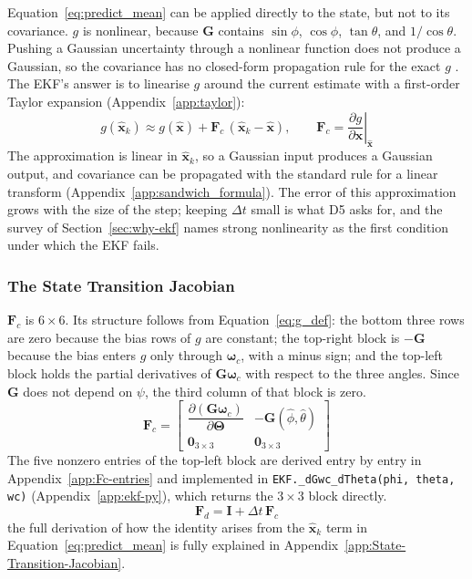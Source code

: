 \documentclass[12pt,a4paper]{article}
\newcommand{\bx}{\bm{x}}
\newcommand{\bF}{\bm{F}}
\newcommand{\bG}{\bm{G}}
\newcommand{\bI}{\bm{I}}
\newcommand{\bomega}{\bm{\omega}}
\newcommand{\bTheta}{\bm{\Theta}}
\begin{document}
{Equation~\eqref{eq:predict_mean} can be applied directly to the
state, but not to its covariance. $g$ is nonlinear, because $\bG$
contains $\sin\phi$, $\cos\phi$, $\tan\theta$, and $1/\cos\theta$.
Pushing a Gaussian uncertainty through a nonlinear function does not
produce a Gaussian, so the covariance has no closed-form
propagation rule for the exact $g$ \citep{grewal2015kalman}. The
EKF's answer is to linearise $g$ around the current estimate with a
first-order Taylor expansion (Appendix~\ref{app:taylor}):
\begin{equation}
  g(\hat{\bx}_k) \approx g(\hat{\bx}) + \bF_c\,(\hat{\bx}_k - \hat{\bx}),
  \qquad
  \bF_c = \left.\frac{\partial g}{\partial \bx}\right|_{\hat{\bx}}
  \label{eq:taylor}
\end{equation}
The approximation is linear in $\hat{\bx}_k$, so a Gaussian input
produces a Gaussian output, and covariance can be propagated with
the standard rule for a linear transform
(Appendix~\ref{app:sandwich_formula}). The error of this
approximation grows with the size of the step; keeping $\Delta t$
small is what D5 asks for, and the survey of
Section~\ref{sec:why-ekf} names strong nonlinearity as the first
condition under which the EKF fails.

\subsubsection{The State Transition Jacobian}

$\bF_c$ is $6\times 6$. Its structure follows from
Equation~\eqref{eq:g_def}: the bottom three rows are zero because
the bias rows of $g$ are constant; the top-right block is $-\bG$
because the bias enters $g$ only through $\bomega_c$, with a minus
sign; and the top-left block holds the partial derivatives of
$\bG\bomega_c$ with respect to the three angles. Since $\bG$ does
not depend on $\psi$, the third column of that block is zero.
\begin{equation}
  \bF_c =
  \begin{bmatrix}
    \dfrac{\partial(\bG\bomega_c)}{\partial\bTheta} & -\bG(\hat{\phi},\hat{\theta}) \\[1em]
    \bm{0}_{3\times 3} & \bm{0}_{3\times 3}
  \end{bmatrix} 
  \label{eq:Fc}
\end{equation}
The five nonzero entries of the top-left block are derived entry by
entry in Appendix~\ref{app:Fc-entries} and implemented in
\texttt{EKF.\_dGwc\_dTheta(phi, theta, wc)}
(Appendix~\ref{app:ekf-py}), which returns the $3\times 3$ block
directly.
\begin{equation}
  \bF_d = \bI + \Delta t\,\bF_c
  \label{eq:Fd}
\end{equation}
the full derivation of how the identity arises from the $\hat{\bx}_k$ term in Equation~\eqref{eq:predict_mean}  is fully explained in 
Appendix~\ref{app:State-Transition-Jacobian}.

}
\end{document}
